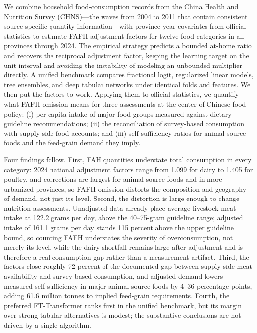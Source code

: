 \documentclass[preprint,12pt,authoryear]{elsarticle}
\begin{document}
We combine household food-consumption records from the China Health and Nutrition Survey (CHNS)---the waves from 2004 to 2011 that contain consistent source-specific quantity information---with province-year covariates from official statistics to estimate FAFH adjustment factors for twelve food categories in all provinces through 2024. The empirical strategy predicts a bounded at-home ratio and recovers the reciprocal adjustment factor, keeping the learning target on the unit interval and avoiding the instability of modeling an unbounded multiplier directly. A unified benchmark compares fractional logit, regularized linear models, tree ensembles, and deep tabular networks under identical folds and features. We then put the factors to work. Applying them to official statistics, we quantify what FAFH omission means for three assessments at the center of Chinese food policy: (i) per-capita intake of major food groups measured against dietary-guideline recommendations; (ii) the reconciliation of survey-based consumption with supply-side food accounts; and (iii) self-sufficiency ratios for animal-source foods and the feed-grain demand they imply.

Four findings follow. First, FAH quantities understate total consumption in every category: 2024 national adjustment factors range from 1.099 for dairy to 1.405 for poultry, and corrections are largest for animal-source foods and in more urbanized provinces, so FAFH omission distorts the composition and geography of demand, not just its level. Second, the distortion is large enough to change nutrition assessments. Unadjusted data already place average livestock-meat intake at 122.2 grams per day, above the 40--75-gram guideline range; adjusted intake of 161.1 grams per day stands 115 percent above the upper guideline bound, so counting FAFH understates the severity of overconsumption, not merely its level, while the dairy shortfall remains large after adjustment and is therefore a real consumption gap rather than a measurement artifact. Third, the factors close roughly 72 percent of the documented gap between supply-side meat availability and survey-based consumption, and adjusted demand lowers measured self-sufficiency in major animal-source foods by 4--36 percentage points, adding 61.6 million tonnes to implied feed-grain requirements. Fourth, the preferred FT-Transformer ranks first in the unified benchmark, but its margin over strong tabular alternatives is modest; the substantive conclusions are not driven by a single algorithm.
\end{document}
